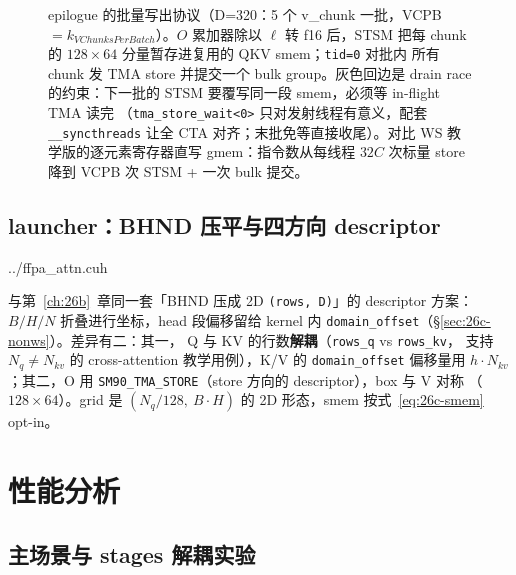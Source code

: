\begin{figure}[H]
\caption{epilogue 的批量写出协议（D=320：5 个 v\_chunk 一批，VCPB
$=k_{VChunksPerBatch}$）。$O$ 累加器除以 $\ell$ 转 f16 后，STSM 把每
chunk 的 $128\times64$ 分量暂存进复用的 QKV smem；\texttt{tid=0} 对批内
所有 chunk 发 TMA store 并提交一个 bulk group。灰色回边是 drain race
的约束：下一批的 STSM 要覆写同一段 smem，必须等 in-flight TMA 读完
（\texttt{tma\_store\_wait<0>} 只对发射线程有意义，配套
\texttt{\_\_syncthreads} 让全 CTA 对齐；末批免等直接收尾）。对比 WS
教学版的逐元素寄存器直写 gmem：指令数从每线程 $32C$ 次标量 store
降到 VCPB 次 STSM + 一次 bulk 提交。}
\label{fig:26c-epilogue}
\end{figure}

\subsection{launcher：BHND 压平与四方向 descriptor}\label{sec:26c-launcher}

\begin{lstinputlisting}[linerange={1277-1304},firstnumber=auto,
  title={ffpa\_attn.cuh L1277-1304（launcher：2D 压平 + 四方向 TMA + opt-in smem）}]{../ffpa_attn.cuh}
\end{lstinputlisting}

与第~\ref{ch:26b}~章同一套「BHND 压成 2D \texttt{(rows, D)}」的
descriptor 方案：$B/H/N$ 折叠进行坐标，head 段偏移留给 kernel 内
\texttt{domain\_offset}（\S\ref{sec:26c-nonws}）。差异有二：其一，
Q 与 KV 的行数\textbf{解耦}（\texttt{rows\_q} vs \texttt{rows\_kv}，
支持 $N_q \ne N_{kv}$ 的 cross-attention 教学用例），K/V 的
\texttt{domain\_offset} 偏移量用 $h \cdot N_{kv}$；其二，O 用
\texttt{SM90\_TMA\_STORE}（store 方向的 descriptor），box 与 V 对称
（$128\times64$）。grid 是 $(N_q/128,\ B\cdot H)$ 的 2D 形态，smem
按式~\eqref{eq:26c-smem} opt-in。

\section{性能分析}\label{sec:26c-perf}

\subsection{主场景与 stages 解耦实验}

